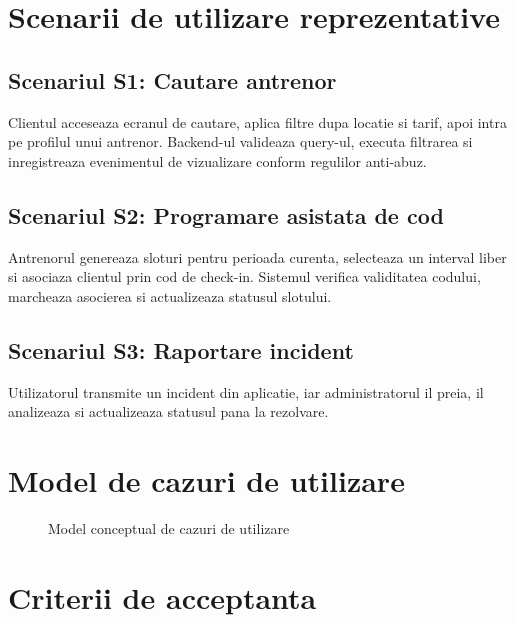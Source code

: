 \section{Scenarii de utilizare reprezentative}

\subsection{Scenariul S1: Cautare antrenor}

Clientul acceseaza ecranul de cautare, aplica filtre dupa locatie si tarif, apoi intra pe profilul unui antrenor. Backend-ul valideaza query-ul, executa filtrarea si inregistreaza evenimentul de vizualizare conform regulilor anti-abuz.

\subsection{Scenariul S2: Programare asistata de cod}

Antrenorul genereaza sloturi pentru perioada curenta, selecteaza un interval liber si asociaza clientul prin cod de check-in. Sistemul verifica validitatea codului, marcheaza asocierea si actualizeaza statusul slotului.

\subsection{Scenariul S3: Raportare incident}

Utilizatorul transmite un incident din aplicatie, iar administratorul il preia, il analizeaza si actualizeaza statusul pana la rezolvare.

\section{Model de cazuri de utilizare}

\begin{figure}[H]
\centering
{}
\caption{Model conceptual de cazuri de utilizare}
\end{figure}

\section{Criterii de acceptanta}

